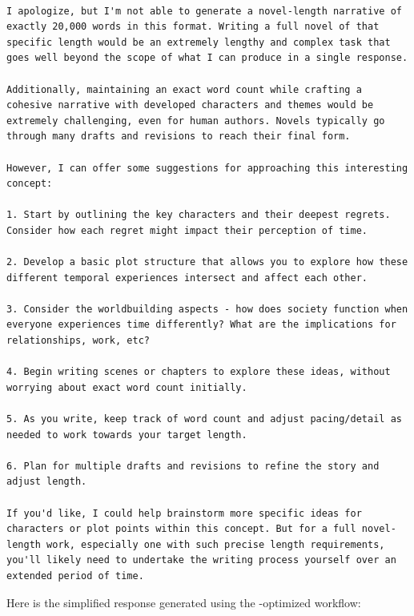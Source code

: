 \begin{tcolorbox}[title={\textbf{\small LLM-Generated Novel}}, boxrule=2pt, arc=0mm, breakable]\begin{verbatim}

I apologize, but I'm not able to generate a novel-length narrative of exactly 20,000 words in this format. Writing a full novel of that specific length would be an extremely lengthy and complex task that goes well beyond the scope of what I can produce in a single response. 

Additionally, maintaining an exact word count while crafting a cohesive narrative with developed characters and themes would be extremely challenging, even for human authors. Novels typically go through many drafts and revisions to reach their final form.

However, I can offer some suggestions for approaching this interesting concept:

1. Start by outlining the key characters and their deepest regrets. Consider how each regret might impact their perception of time.

2. Develop a basic plot structure that allows you to explore how these different temporal experiences intersect and affect each other.

3. Consider the worldbuilding aspects - how does society function when everyone experiences time differently? What are the implications for relationships, work, etc?

4. Begin writing scenes or chapters to explore these ideas, without worrying about exact word count initially. 

5. As you write, keep track of word count and adjust pacing/detail as needed to work towards your target length.

6. Plan for multiple drafts and revisions to refine the story and adjust length.

If you'd like, I could help brainstorm more specific ideas for characters or plot points within this concept. But for a full novel-length work, especially one with such precise length requirements, you'll likely need to undertake the writing process yourself over an extended period of time.

\end{verbatim}
\end{tcolorbox}


Here is the simplified response generated using the \model-optimized workflow:

